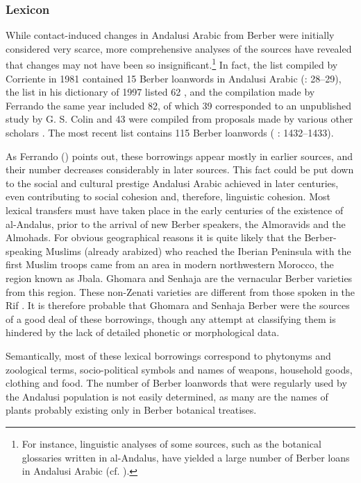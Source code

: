 \documentclass[output=paper,modfonts,nonflat]{langsci/langscibook}
\begin{document}
\subsubsection{Lexicon}

While contact-induced changes in Andalusi Arabic from Berber were initially considered very scarce, more comprehensive analyses of the sources have revealed that changes may not have been so insignificant.\footnote{For instance, linguistic analyses of some sources, such as the botanical glossaries written in al-Andalus, have yielded a large number of Berber loans in Andalusi Arabic (cf. \citealt{Abūl-Ḫayral-Išbīlī2004,Abūl-Ḫayral-Išbīlī2007,Corriente2012}).} In fact, the list compiled by Corriente in 1981 contained 15 Berber loanwords in Andalusi Arabic (\citeyear{Corriente1981}: 28–29), the list in his dictionary of 1997 listed 62 \citep[590]{Corriente1997dictionary}, and the compilation made by Ferrando the same year included 82, of which 39 corresponded to an unpublished study by G. S. Colin and 43 were compiled from proposals made by various other scholars \citep[133]{Ferrando1997}. The most recent list contains 115 Berber loanwords ( \citealt{CorrientePereiraVicente2017}: 1432–1433).

As Ferrando (\citeyear[140]{Ferrando1997}) points out, these borrowings appear mostly in earlier sources, and their number decreases considerably in later sources. This fact could be put down to the social and cultural prestige Andalusi Arabic achieved in later centuries, even contributing to social cohesion and, therefore, linguistic cohesion. Most lexical transfers must have taken place in the early centuries of the existence of al-Andalus, prior to the arrival of new Berber speakers, the Almoravids and the Almohads. For obvious geographical reasons it is quite likely that the Berber-speaking Muslims (already arabized) who reached the Iberian Peninsula with the first Muslim troops came from an area in modern northwestern Morocco, the region known as Jbala. Ghomara and Senhaja are the vernacular Berber varieties from this region. These non-Zenati varieties are different from those spoken in the Rif \citep{Kossmann2017}. It is therefore probable that Ghomara and Senhaja Berber were the sources of a good deal of these borrowings, though any attempt at classifying them is hindered by the lack of detailed phonetic or morphological data. 

Semantically, most of these lexical borrowings correspond to phytonyms and zoological terms, socio-political symbols and names of weapons, household goods, clothing and food. The number of Berber loanwords that were regularly used by the Andalusi population is not easily determined, as many are the names of plants probably existing only in Berber botanical treatises. 
\end{document}
